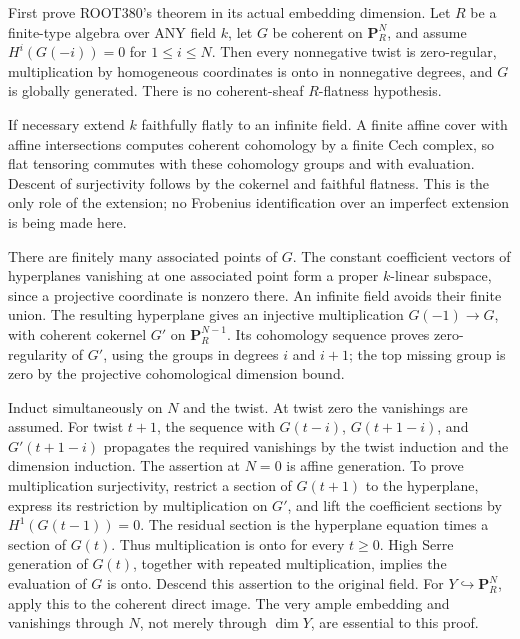 \documentclass[11pt]{article}
\begin{document}
First prove ROOT380's theorem in its actual embedding dimension. Let \(R\) be a finite-type algebra over ANY field \(k\), let \(G\) be coherent on \(\mathbf P^N_R\), and assume \(H^i(G(-i))=0\) for \(1\le i\le N\). Then every nonnegative twist is zero-regular, multiplication by homogeneous coordinates is onto in nonnegative degrees, and \(G\) is globally generated. There is no coherent-sheaf \(R\)-flatness hypothesis.

If necessary extend \(k\) faithfully flatly to an infinite field. A finite affine cover with affine intersections computes coherent cohomology by a finite Cech complex, so flat tensoring commutes with these cohomology groups and with evaluation. Descent of surjectivity follows by the cokernel and faithful flatness. This is the only role of the extension; no Frobenius identification over an imperfect extension is being made here.

There are finitely many associated points of \(G\). The constant coefficient vectors of hyperplanes vanishing at one associated point form a proper \(k\)-linear subspace, since a projective coordinate is nonzero there. An infinite field avoids their finite union. The resulting hyperplane gives an injective multiplication \(G(-1)\to G\), with coherent cokernel \(G'\) on \(\mathbf P^{N-1}_R\). Its cohomology sequence proves zero-regularity of \(G'\), using the groups in degrees \(i\) and \(i+1\); the top missing group is zero by the projective cohomological dimension bound.

Induct simultaneously on \(N\) and the twist. At twist zero the vanishings are assumed. For twist \(t+1\), the sequence with \(G(t-i)\), \(G(t+1-i)\), and \(G'(t+1-i)\) propagates the required vanishings by the twist induction and the dimension induction. The assertion at \(N=0\) is affine generation. To prove multiplication surjectivity, restrict a section of \(G(t+1)\) to the hyperplane, express its restriction by multiplication on \(G'\), and lift the coefficient sections by \(H^1(G(t-1))=0\). The residual section is the hyperplane equation times a section of \(G(t)\). Thus multiplication is onto for every \(t\ge0\). High Serre generation of \(G(t)\), together with repeated multiplication, implies the evaluation of \(G\) is onto. Descend this assertion to the original field. For \(Y\hookrightarrow\mathbf P^N_R\), apply this to the coherent direct image. The very ample embedding and vanishings through \(N\), not merely through \(\dim Y\), are essential to this proof.
\end{document}
